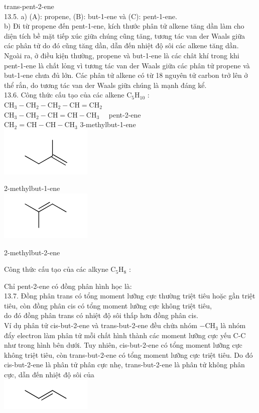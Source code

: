 \documentclass[10pt]{article}
\begin{document}
trans-pent-2-ene\\
13.5. a) (A): propene, (B): but-1-ene và (C): pent-1-ene.\\
b) Đi từ propene đến pent-1-ene, kích thước phân tử alkene tăng dần làm cho diện tích bề mặt tiếp xúc giữa chúng cũng tăng, tương tác van der Waals giữa các phân tử do đó cũng tăng dần, dẫn đến nhiệt độ sôi các alkene tăng dần. Ngoài ra, ở điều kiện thường, propene và but-1-ene là các chât khí trong khi pent-1-ene là chất lỏng vì tương tác van der Waals giữa các phân tử propene và but-1-ene chưa đủ lớn. Các phân tử alkene có từ 18 nguyên tử carbon trở lên ở thể rắn, do tương tác van der Waals giữa chúng là mạnh đáng kể.\\
13.6. Công thức cấu tạo của các alkene $\mathrm{C}_{5} \mathrm{H}_{10}$ :\\
$\mathrm{CH}_{3}-\mathrm{CH}_{2}-\mathrm{CH}_{2}-\mathrm{CH}=\mathrm{CH}_{2}$\\
$\mathrm{CH}_{3}-\mathrm{CH}_{2}-\mathrm{CH}=\mathrm{CH}-\mathrm{CH}_{3} \quad$ pent-2-ene\\
$\mathrm{CH}_{2}=\mathrm{CH}-\mathrm{CH}-\mathrm{CH}_{3}$ 3-methylbut-1-ene\\
\includegraphics{smile-e7ce1eecf7434732b6a4644e5d7a7fd45bed61c6}

2-methylbut-1-ene\\
\includegraphics{smile-a08d301a8a3d50531fa9d33146828dcd476cb515}

2-methylbut-2-ene

Công thức cấu tạo của các alkyne $\mathrm{C}_{5} \mathrm{H}_{8}$ :

Chỉ pent-2-ene có đồng phân hình học là:\\
13.7. Đồng phân trans có tổng moment lưỡng cực thường triệt tiêu hoặc gần triệt tiêu, còn đồng phân cis có tổng moment lưỡng cực không triệt tiêu,\\
do đó đồng phân trans có nhiệt độ sôi thấp hơn đồng phân cis.\\
Ví dụ phân tử cis-but-2-ene và trans-but-2-ene đều chứa nhóm $-\mathrm{CH}_{3}$ là nhóm đẩy electron làm phân tử mỗi chất hình thành các moment lưỡng cực yếu C-C như trong hình bên dưới. Tuy nhiên, cis-but-2-ene có tổng moment lưỡng cực không triệt tiêu, còn trans-but-2-ene có tổng moment lưỡng cực triệt tiêu. Do đó cis-but-2-ene là phân tử phân cực nhẹ, trans-but-2-ene là phân tử không phân cực, dẫn đến nhiệt độ sôi của\\
\includegraphics{smile-06ba4484842af8f9c690159ba5958ea9fa21c672}
\end{document}
